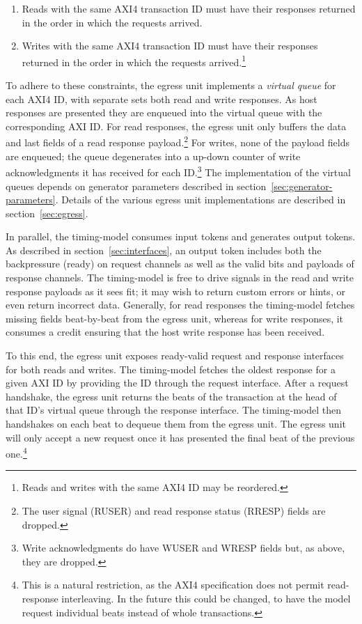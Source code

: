 \begin{enumerate}

    \item Reads with the same AXI4 transaction ID must have their responses returned in the
        order in which the requests arrived.

    \item Writes with the same AXI4 transaction ID must have their responses returned in
        the order in which the requests arrived.\footnote{Reads and writes with
        the same AXI4 ID may be reordered.}

\end{enumerate}

To adhere to these constraints, the egress unit implements a \emph{virtual queue}
for each AXI4 ID, with separate sets both read and write responses. As host
responses are presented they are enqueued into the virtual queue with the
corresponding AXI ID. For read responses, the egress unit only buffers the data
and last fields of a read response payload.\footnote{The user signal (RUSER)
and read response status (RRESP) fields are dropped.} For writes, none of the
payload fields are enqueued; the queue degenerates into a up-down counter of
write acknowledgments it has received for each ID.\footnote{Write
acknowledgments do have WUSER and WRESP fields but, as above, they are
dropped.} The implementation of the virtual queues depends on generator
parameters described in section~\ref{sec:generator-parameters}. Details of the
various egress unit implementations are described in section~\ref{sec:egress}.

In parallel, the timing-model consumes input tokens and generates output
tokens. As described in section~\ref{sec:interfaces}, an output token includes
both the backpressure (ready) on request channels as well as the valid bits and
payloads of response channels. The timing-model is free to drive signals in the
read and write response payloads as it sees fit; it may wish to return custom
errors or hints, or even return incorrect data. Generally, for read responses
the timing-model fetches missing fields beat-by-beat from the egress unit,
whereas for write responses, it consumes a credit ensuring that the host write
response has been received.

To this end, the egress unit exposes ready-valid request and response
interfaces for both reads and writes. The timing-model fetches the oldest
response for a given AXI ID by providing the ID through the request interface.
After a request handshake, the egress unit returns the beats of the transaction
at the head of that ID's virtual queue through the response interface. The
timing-model then handshakes on each beat to dequeue them from the egress unit.
The egress unit will only accept a new request once it has presented the final
beat of the previous one.\footnote{This is a natural restriction, as the AXI4
specification does not permit read-response interleaving. In the future this
could be changed, to have the model request individual beats instead of whole
transactions.}

